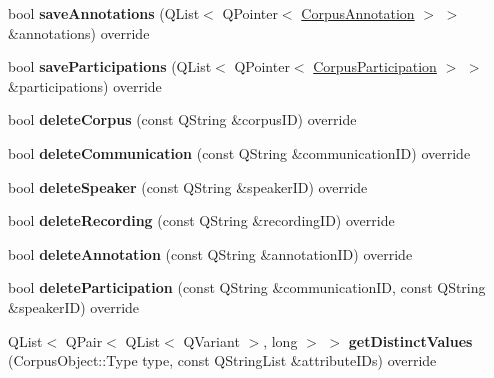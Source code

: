 \begin{DoxyCompactItemize}
\item 
\mbox{\label{class_s_q_l_metadata_datastore_a0ec25893f551f6dfd8afa64ba7a381da}} 
bool {\bfseries save\+Annotations} (Q\+List$<$ Q\+Pointer$<$ \hyperlink{class_corpus_annotation}{Corpus\+Annotation} $>$ $>$ \&annotations) override
\item 
\mbox{\label{class_s_q_l_metadata_datastore_a755965e6b1e9fd5f36f229903da63c99}} 
bool {\bfseries save\+Participations} (Q\+List$<$ Q\+Pointer$<$ \hyperlink{class_corpus_participation}{Corpus\+Participation} $>$ $>$ \&participations) override
\item 
\mbox{\label{class_s_q_l_metadata_datastore_a5044a61f7a32431ed09bad4d00238d90}} 
bool {\bfseries delete\+Corpus} (const Q\+String \&corpus\+ID) override
\item 
\mbox{\label{class_s_q_l_metadata_datastore_a99627565c55a2f0a9d97f9b6673afce1}} 
bool {\bfseries delete\+Communication} (const Q\+String \&communication\+ID) override
\item 
\mbox{\label{class_s_q_l_metadata_datastore_aa996602aad84051cfe5418c9dcfd88c5}} 
bool {\bfseries delete\+Speaker} (const Q\+String \&speaker\+ID) override
\item 
\mbox{\label{class_s_q_l_metadata_datastore_a0d71a10465c0483dbb3e9dc746f443f5}} 
bool {\bfseries delete\+Recording} (const Q\+String \&recording\+ID) override
\item 
\mbox{\label{class_s_q_l_metadata_datastore_ac1740764c15007304512aba0b10e8bf2}} 
bool {\bfseries delete\+Annotation} (const Q\+String \&annotation\+ID) override
\item 
\mbox{\label{class_s_q_l_metadata_datastore_a34cb16dab3ca8d3146b614d8fd473dfc}} 
bool {\bfseries delete\+Participation} (const Q\+String \&communication\+ID, const Q\+String \&speaker\+ID) override
\item 
\mbox{\label{class_s_q_l_metadata_datastore_ade11a92ffd79a15127093665a25e8312}} 
Q\+List$<$ Q\+Pair$<$ Q\+List$<$ Q\+Variant $>$, long $>$ $>$ {\bfseries get\+Distinct\+Values} (Corpus\+Object\+::\+Type type, const Q\+String\+List \&attribute\+I\+Ds) override
\end{DoxyCompactItemize}
